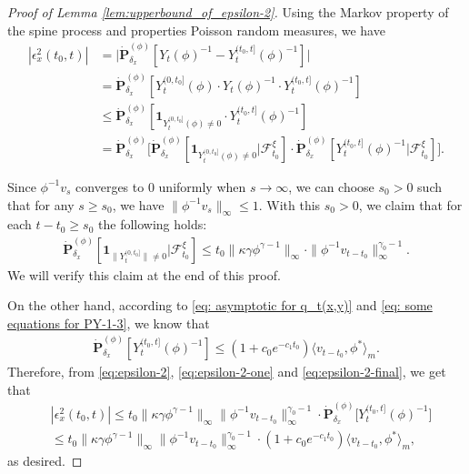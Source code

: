 \documentclass[12pt,a4paper]{amsart}
\theoremstyle{definition}
\numberwithin{equation}{section}
\begin{document}
\begin{proof}
  [Proof of Lemma \ref{lem:upperbound_of_epsilon-2}]
Using the Markov property of the spine process and 
properties Poisson random measures, we have
\begin{align}\label{eq:epsilon-2}
	|\epsilon_x^2(t_0,t)|
	&= \big| \dot{\mathbf P}_{\delta_x}^{(\phi)}[Y_t(\phi)^{-1} - Y^{(t_0,t]}_t(\phi)^{-1}] \big|
	\\&= \dot{\mathbf P}_{\delta_x}^{(\phi)}[Y_t^{(0,t_0]}(\phi)\cdot Y_t(\phi)^{-1}\cdot Y^{(t_0,t]}_t(\phi)^{-1}]
	\\&\leq \dot{\mathbf P}_{\delta_x}^{(\phi)}[\mathbf 1_{Y_t^{(0,t_0]}(\phi)\neq 0}\cdot Y^{(t_0,t]}_t(\phi)^{-1}]
	\\&= \dot{\mathbf P}_{\delta_x}^{(\phi)} \big[\dot{\mathbf P}_{\delta_x}^{(\phi)}[\mathbf 1_{Y_t^{(0,t_0]}(\phi)\neq 0}|\mathscr F^\xi_{t_0}] \cdot \dot{\mathbf P}_{\delta_x}^{(\phi)} [ Y^{(t_0,t]}_t(\phi)^{-1}|\mathscr F^\xi_{t_0}] \big].
\end{align}




Since $\phi^{-1}v_s$ converges to $0$ uniformly when $s\to \infty$, we can choose  $s_0>0$ such that for any $s\geq s_0$, we have $\|\phi^{-1}v_s\|_{\infty} \leq 1$.
With this $s_0>0$, we claim that for each $t - t_0\geq s_0$ the following holds:
\begin{align}
  \label{eq:epsilon-2-one}
  \dot{\mathbf P}_{\delta_x}^{(\phi)}[\mathbf 1_{\| Y_t^{(0,t_0]}\|\neq 0}|\mathscr F^\xi_{t_0}]
  \leq t_0\|\kappa \gamma \phi^{\gamma - 1}\|_\infty \cdot \|\phi^{-1}v_{t-t_0}\|^{\gamma_0-1}_\infty.
\end{align}
We will verify this claim at the end of this proof.

On the other hand, according to \eqref{eq: asymptotic for q_t(x,y)} and \eqref{eq: some equations for PY-1-3}, we know that
\begin{align}\label{eq:epsilon-2-final}
	\dot{\mathbf P}_{\delta_x}^{(\phi)}[ Y^{(t_0,t]}_t(\phi)^{-1}]
	\leq (1+c_0 e^{-c_1 t_0}) \langle v_{t-t_0},\phi^* \rangle_m.
\end{align}
Therefore, from \eqref{eq:epsilon-2}, \eqref{eq:epsilon-2-one} and \eqref{eq:epsilon-2-final}, we get that
\begin{align}
&|\epsilon_x^2(t_0,t)|
\leq t_0 \|\kappa \gamma \phi^{\gamma - 1}\|_\infty \|\phi^{-1} v_{t-t_0}\|_\infty^{\gamma_0 - 1} \cdot \dot{\mathbf P}_{\delta_x}^{(\phi)} \big[ Y_t^{(t_0, t]}(\phi)^{-1} \big]
\\ & \leq t_0 \|\kappa \gamma \phi^{\gamma - 1}\|_\infty \|\phi^{-1} v_{t-t_0}\|_\infty^{\gamma_0 - 1} \cdot (1+ c_0 e^{-c_1 t_0})\langle v_{t-t_0}, \phi^* \rangle_m,
\end{align}
as desired.


\end{proof}
\end{document}
